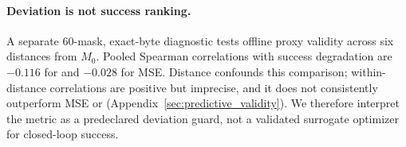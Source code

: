 \paragraph{Deviation is not success ranking.}
A separate 60-mask, exact-byte diagnostic tests offline proxy validity across six distances from $M_0$. Pooled Spearman correlations with success degradation are $-0.116$ for \dpac and $-0.028$ for MSE. Distance confounds this comparison; within-distance \dpac correlations are positive but imprecise, and it does not consistently outperform MSE or \dfunc (Appendix~\ref{sec:predictive_validity}). We therefore interpret the metric as a predeclared deviation guard, not a validated surrogate optimizer for closed-loop success.